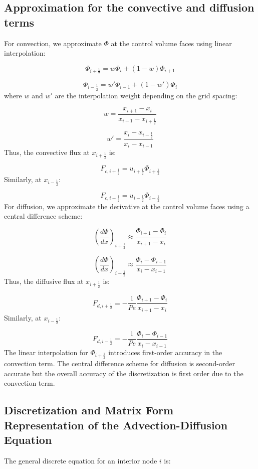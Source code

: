 \documentclass{article}
\begin{document}
\subsection{Approximation for the convective and diffusion terms}

For convection, we approximate \( \Phi \) at the control volume faces using linear interpolation:

\[
\Phi_{i+\frac{1}{2}} = w \Phi_i + (1 - w) \Phi_{i+1}
\]

\[
\Phi_{i-\frac{1}{2}} = w' \Phi_{i-1} + (1-w') \Phi_{i} 
\]
where \( w \) and \( w' \) are the interpolation weight depending on the grid spacing:

\[
w = \frac{x_{i+1} - x_i}{x_{i+1} - x_{i+\frac{1}{2}}}
\]

\[
w' = \frac{x_i - x_{i-\frac{1}{2}}}{x_i - x_{i-1}}
\]
Thus, the convective flux at \( x_{i+\frac{1}{2}} \) is:

\[
F_{c, i+\frac{1}{2}} = u_{i+\frac{1}{2}} \Phi_{i+\frac{1}{2}}
\]
Similarly, at \( x_{i-\frac{1}{2}} \):

\[
F_{c, i-\frac{1}{2}} = u_{i-\frac{1}{2}} \Phi_{i-\frac{1}{2}}
\]
For diffusion, we approximate the derivative at the control volume faces using a central difference scheme:

\[
\left( \frac{d\Phi}{dx} \right)_{i+\frac{1}{2}} \approx \frac{\Phi_{i+1} - \Phi_i}{x_{i+1} - x_i}
\]

\[
\left( \frac{d\Phi}{dx} \right)_{i-\frac{1}{2}} \approx \frac{\Phi_i - \Phi_{i-1}}{x_i - x_{i-1}}
\]
Thus, the diffusive flux at \( x_{i+\frac{1}{2}} \) is:

\[
F_{d, i+\frac{1}{2}} = - \frac{1}{Pe} \frac{\Phi_{i+1} - \Phi_i}{x_{i+1} - x_i}
\]
Similarly, at \( x_{i-\frac{1}{2}} \):

\[
F_{d, i-\frac{1}{2}} = - \frac{1}{Pe} \frac{\Phi_i - \Phi_{i-1}}{x_i - x_{i-1}}
\]
The linear interpolation for \( \Phi_{i+\frac{1}{2}} \) introduces first-order accuracy in the convection term. The central difference scheme 
for diffusion is second-order accurate but the overall accuracy of the discretization is first order due to the convection term.

\subsection{Discretization and Matrix Form Representation of the Advection-Diffusion Equation}

The general discrete equation for an interior node \(i\) is:
\end{document}
